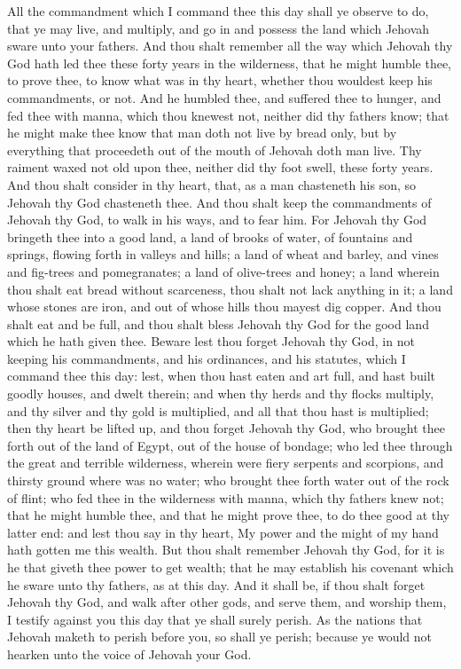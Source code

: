All the commandment which I command thee this day shall ye observe to do, that ye may live, and multiply, and go in and possess the land which Jehovah sware unto your fathers. And thou shalt remember all the way which Jehovah thy God hath led thee these forty years in the wilderness, that he might humble thee, to prove thee, to know what was in thy heart, whether thou wouldest keep his commandments, or not. And he humbled thee, and suffered thee to hunger, and fed thee with manna, which thou knewest not, neither did thy fathers know; that he might make thee know that man doth not live by bread only, but by everything that proceedeth out of the mouth of Jehovah doth man live. Thy raiment waxed not old upon thee, neither did thy foot swell, these forty years. And thou shalt consider in thy heart, that, as a man chasteneth his son, so Jehovah thy God chasteneth thee. And thou shalt keep the commandments of Jehovah thy God, to walk in his ways, and to fear him. For Jehovah thy God bringeth thee into a good land, a land of brooks of water, of fountains and springs, flowing forth in valleys and hills; a land of wheat and barley, and vines and fig-trees and pomegranates; a land of olive-trees and honey; a land wherein thou shalt eat bread without scarceness, thou shalt not lack anything in it; a land whose stones are iron, and out of whose hills thou mayest dig copper. And thou shalt eat and be full, and thou shalt bless Jehovah thy God for the good land which he hath given thee.  Beware lest thou forget Jehovah thy God, in not keeping his commandments, and his ordinances, and his statutes, which I command thee this day: lest, when thou hast eaten and art full, and hast built goodly houses, and dwelt therein; and when thy herds and thy flocks multiply, and thy silver and thy gold is multiplied, and all that thou hast is multiplied; then thy heart be lifted up, and thou forget Jehovah thy God, who brought thee forth out of the land of Egypt, out of the house of bondage; who led thee through the great and terrible wilderness, wherein were fiery serpents and scorpions, and thirsty ground where was no water; who brought thee forth water out of the rock of flint; who fed thee in the wilderness with manna, which thy fathers knew not; that he might humble thee, and that he might prove thee, to do thee good at thy latter end: and lest thou say in thy heart, My power and the might of my hand hath gotten me this wealth. But thou shalt remember Jehovah thy God, for it is he that giveth thee power to get wealth; that he may establish his covenant which he sware unto thy fathers, as at this day. And it shall be, if thou shalt forget Jehovah thy God, and walk after other gods, and serve them, and worship them, I testify against you this day that ye shall surely perish. As the nations that Jehovah maketh to perish before you, so shall ye perish; because ye would not hearken unto the voice of Jehovah your God. 

